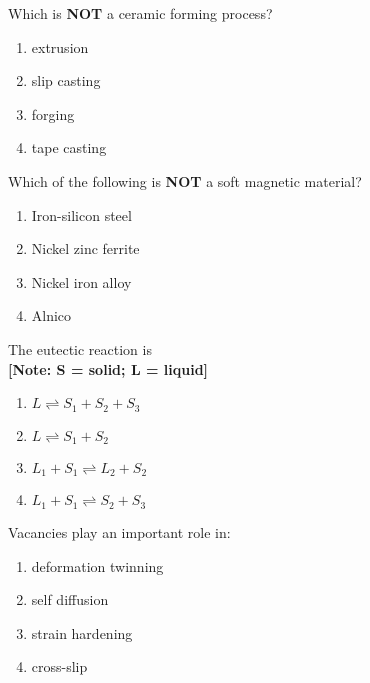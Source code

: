 \item    Which is \textbf{NOT} a ceramic forming process?
    \begin{enumerate}
        \item extrusion
        \item slip casting
        \item forging
        \item tape casting
    \end{enumerate}
   
\item    Which of the following is \textbf{NOT} a soft magnetic material?
    \begin{enumerate}
        \item Iron-silicon steel
        \item Nickel zinc ferrite
        \item Nickel iron alloy
        \item Alnico
    \end{enumerate}
    
 \item The eutectic reaction is \\
    \textbf{[Note: S = solid; L = liquid]}
    \begin{enumerate}
        \item $L \rightleftharpoons S_1 + S_2 + S_3$
        \item $L \rightleftharpoons S_1 + S_2$
        \item $L_1 + S_1 \rightleftharpoons L_2 + S_2$
        \item $L_1 + S_1 \rightleftharpoons S_2 + S_3$
    \end{enumerate}
  
  \item  Vacancies play an important role in:
    \begin{enumerate}
        \item deformation twinning
        \item self diffusion
        \item strain hardening
        \item cross-slip
    \end{enumerate}



